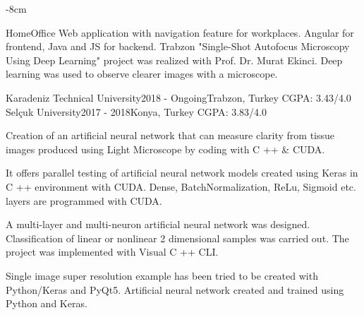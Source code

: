 \documentclass[10pt,a4paper]{altacv}
\begin{document}


\begin{adjustwidth}{}{-8cm}
\makecvheader
\end{adjustwidth}

 {HomeOffice}
Web application with navigation feature for workplaces. Angular for frontend, Java and JS for backend.
\smallskip
{} {Trabzon}
"Single-Shot Autofocus Microscopy Using Deep Learning" project was realized with Prof. Dr. Murat Ekinci. Deep learning was used to observe clearer images with a microscope.


 {Karadeniz Technical University}{2018 - Ongoing}{Trabzon, Turkey} 
\textsc{CGPA}: 3.43/4.0
\smallskip
\cvevent{} {Selçuk University}{2017 - 2018}{Konya, Turkey} 
\textsc{CGPA}: 3.83/4.0

\smallskip
{}
 {}

Creation of an artificial neural network that can measure clarity from tissue images produced using Light Microscope by coding with C ++ \& CUDA.
\\

\divider

It offers parallel testing of artificial neural network models created using Keras in C ++ environment with CUDA. Dense, BatchNormalization, ReLu, Sigmoid etc. layers are programmed with CUDA.


\divider

A multi-layer and multi-neuron artificial neural network was designed. Classification of linear or nonlinear 2 dimensional samples was carried out. The project was implemented with Visual C ++ CLI.


\divider

Single image super resolution example has been tried to be created with Python/Keras and PyQt5. Artificial neural network created and trained using Python and Keras.
\end{document}
